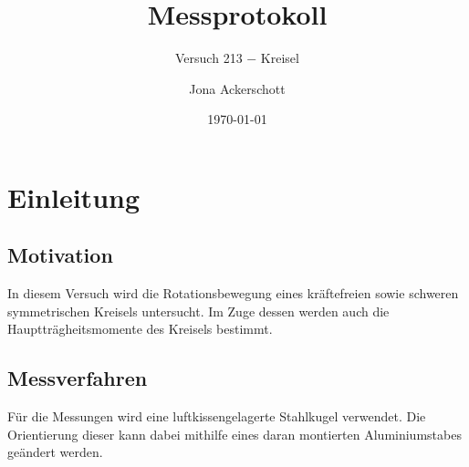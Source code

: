 \documentclass[12pt,a4paper,german]{scrartcl}
\author{Jona Ackerschott}
\title{Messprotokoll}
\subtitle{Versuch 213 $-$ Kreisel}
\date{\today}
\numberwithin{equation}{section}
\begin{document}
  \maketitle

  \tableofcontents

  \section{Einleitung}
  \subsection{Motivation}
  In diesem Versuch wird die Rotationsbewegung eines kräftefreien sowie schweren symmetrischen Kreisels untersucht.
  Im Zuge dessen werden auch die Hauptträgheitsmomente des Kreisels bestimmt.

  \subsection{Messverfahren}
  Für die Messungen wird eine luftkissengelagerte Stahlkugel verwendet. Die Orientierung dieser kann dabei mithilfe eines daran montierten Aluminiumstabes geändert werden.
\end{document}
